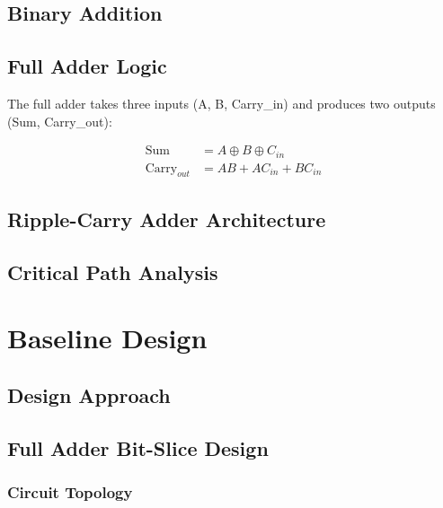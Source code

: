 \documentclass[12pt,letterpaper]{article}
\begin{document}

\subsection{Binary Addition}

\subsection{Full Adder Logic}

The full adder takes three inputs (A, B, Carry\_in) and produces two outputs (Sum, Carry\_out):

\begin{align}
\text{Sum} &= A \oplus B \oplus C_{in} \\
\text{Carry}_{out} &= AB + AC_{in} + BC_{in}
\end{align}

\subsection{Ripple-Carry Adder Architecture}

\subsection{Critical Path Analysis}

\section{Baseline Design}
\label{sec:baseline}


\subsection{Design Approach}

\subsection{Full Adder Bit-Slice Design}

\subsubsection{Circuit Topology}
\end{document}
